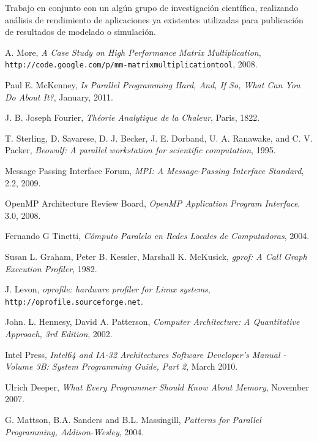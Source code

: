 \documentclass[a4paper]{report}
\begin{document}
\bigskip

Trabajo en conjunto con un alg\'un grupo de investigaci\'on cient\'ifica,
realizando an\'alisis de rendimiento de aplicaciones ya existentes utilizadas
para publicaci\'on de resultados de modelado o simulaci\'on.

\begin{thebibliography}{9}

  A. More,
  \emph{A Case Study on High Performance Matrix Multiplication},
  {\tt http://code.google.com/p/mm-matrixmultiplicationtool},
  2008.

  Paul E. McKenney,
  \emph{Is Parallel Programming Hard, And, If So, What Can You Do About It?},
  January, 2011.

  J. B. Joseph Fourier, \emph{Th\'eorie Analytique de la Chaleur}, Paris, 1822.

  T. Sterling, D. Savarese, D. J. Becker, J. E. Dorband, U. A. Ranawake,
  and C. V. Packer,
  \emph{Beowulf: A parallel workstation for scientific computation},
  1995.

  Message Passing Interface Forum,
  \emph{MPI: A Message-Passing Interface Standard},
  2.2,
  2009.

  OpenMP Architecture Review Board,
  \emph{OpenMP Application Program Interface}.
  3.0,
  2008.

  Fernando G Tinetti,
  \emph{C\'omputo Paralelo en Redes Locales de Computadoras},
  2004.

  Susan L. Graham,  Peter B. Kessler,  Marshall K. McKusick,
  \emph{gprof: A Call Graph Execution Profiler},
  1982.
  
  J. Levon,
  \emph{oprofile: hardware profiler for Linux systems},
       {\tt http://oprofile.sourceforge.net}.
  
  John. L. Hennesy, David A. Patterson,
  \emph{Computer Architecture: A Quantitative Approach, 3rd Edition},
  2002.

  Intel Press,
  \emph{Intel64 and IA-32 Architectures Software Developer's Manual - Volume
    3B: System Programming Guide, Part 2},
  March 2010.

  Ulrich Deeper,
  \emph{What Every Programmer Should Know About Memory},
  November 2007.

  G. Mattson, B.A. Sanders and B.L. Massingill, 
  \emph{Patterns for Parallel Programming, Addison-Wesley},
  2004.
  

\end{thebibliography}
\end{document}
